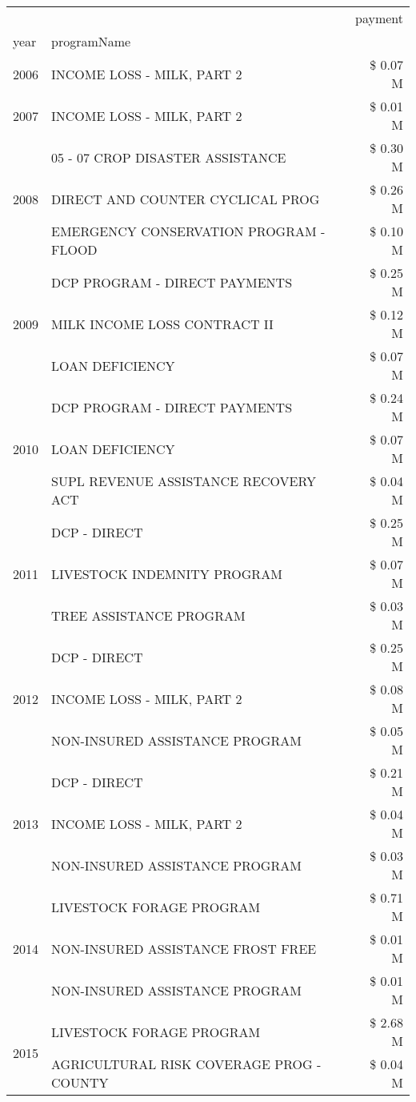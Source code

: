 \begin{tabular}{llr}
\toprule
 &  & payment \\
year & programName &  \\
\midrule
2006 & INCOME LOSS - MILK, PART 2 & \$ 0.07 M \\
\cline{1-3}
2007 & INCOME LOSS - MILK, PART 2 & \$ 0.01 M \\
\cline{1-3}
\multirow[t]{3}{*}{2008} & 05 - 07 CROP DISASTER ASSISTANCE & \$ 0.30 M \\
 & DIRECT AND COUNTER CYCLICAL PROG & \$ 0.26 M \\
 & EMERGENCY CONSERVATION PROGRAM - FLOOD & \$ 0.10 M \\
\cline{1-3}
\multirow[t]{3}{*}{2009} & DCP PROGRAM - DIRECT PAYMENTS & \$ 0.25 M \\
 & MILK INCOME LOSS CONTRACT II & \$ 0.12 M \\
 & LOAN DEFICIENCY & \$ 0.07 M \\
\cline{1-3}
\multirow[t]{3}{*}{2010} & DCP PROGRAM - DIRECT PAYMENTS & \$ 0.24 M \\
 & LOAN DEFICIENCY & \$ 0.07 M \\
 & SUPL REVENUE ASSISTANCE RECOVERY ACT & \$ 0.04 M \\
\cline{1-3}
\multirow[t]{3}{*}{2011} & DCP - DIRECT & \$ 0.25 M \\
 & LIVESTOCK INDEMNITY PROGRAM & \$ 0.07 M \\
 & TREE ASSISTANCE PROGRAM & \$ 0.03 M \\
\cline{1-3}
\multirow[t]{3}{*}{2012} & DCP - DIRECT & \$ 0.25 M \\
 & INCOME LOSS - MILK, PART 2 & \$ 0.08 M \\
 & NON-INSURED ASSISTANCE PROGRAM & \$ 0.05 M \\
\cline{1-3}
\multirow[t]{3}{*}{2013} & DCP - DIRECT & \$ 0.21 M \\
 & INCOME LOSS - MILK, PART 2 & \$ 0.04 M \\
 & NON-INSURED ASSISTANCE PROGRAM & \$ 0.03 M \\
\cline{1-3}
\multirow[t]{3}{*}{2014} & LIVESTOCK FORAGE PROGRAM & \$ 0.71 M \\
 & NON-INSURED ASSISTANCE FROST FREE & \$ 0.01 M \\
 & NON-INSURED ASSISTANCE PROGRAM & \$ 0.01 M \\
\cline{1-3}
\multirow[t]{3}{*}{2015} & LIVESTOCK FORAGE PROGRAM & \$ 2.68 M \\
 & AGRICULTURAL RISK COVERAGE PROG - COUNTY & \$ 0.04 M \\

\end{tabular}

